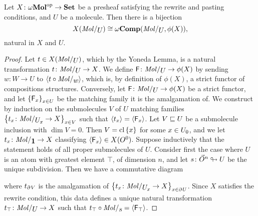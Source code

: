 \begin{lem} \label{lem:stricter_hom_set_iso_presheaf}
    Let \( X \colon \opp{\omegaMol} \to \Set \) be a presheaf satisfying the rewrite and pasting conditions, and \( U \) be a molecule.
    Then there is a bijection
    \begin{equation*}
        X(\molecin{U}) \cong \Comp(\molecin{U}, \phi(X)),
    \end{equation*}
    natural in \( X \) and \( U \).
\end{lem}
\begin{proof}
    Let \( t \in X(\molecin{U}) \), which by the Yoneda Lemma, is a natural transformation \( t \colon \molecin{U} \to X \).
    We define \( \F \colon \molecin{U} \to \phi(X) \) by sending \( w \colon W \to U \) to \( \pcell{t \after \molecin{w}} \), which is, by definition of \( \phi(X) \), a strict functor of compositions structures.
    Conversely, let \( \F \colon \molecin{U} \to \phi(X) \) be a strict functor, and let \( \set{\F_x}_{x \in U} \) be the matching family it is the amalgamation of.
    We construct by induction on the submolecules \( V \) of \( U \) matching families \( \set{t_x \colon \molecin{\imel{U}{x}} \to X}_{x \in V} \) such that \( \pcell{t_x} = \pcell{\F_x} \).    
    Let \( V \submol U \) be a submolecule inclusion with \( \dim V = 0 \).
    Then \( V = \clset{x} \) for some \( x \in \gr{0}{U} \), and we let \( t_x \colon \molecin{\pt} \to X \) classifying \( \pcell{\F_x} \in X(\globe{0}) \).
    Suppose inductively that the statement holds of all proper submolecules of \( U \).
    Consider first the case where \( U \) is an atom with greatest element \( \top \), of dimension \( n \), and let \( s \colon \dglobe{n} \sd U \) be the unique subdivision.
    Then we have a commutative diagram
    \begin{center}
    \end{center}
    where \( t_{\bd{}{} V} \) is the amalgamation of \( \set{t_x \colon \molecin{\imel{U}{x}} \to X}_{x \in \bd{}{} U} \).
    Since \( X \) satisfies the rewrite condition, this data defines a unique natural transformation \( t_\top \colon \molecin{U} \to X \) such that \( t_\top \after \molecin{s} = \pcell{\F_\top} \).

\end{proof}
